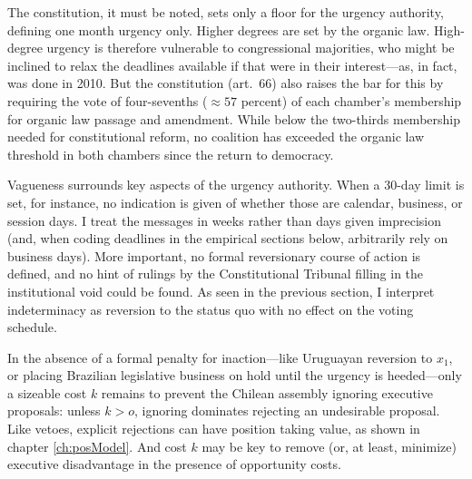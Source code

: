 \documentclass[letter,12pt]{article}
\begin{document}
The constitution, it must be noted, sets only a floor for the urgency authority, defining one month urgency only. Higher degrees are set by the organic law. High-degree urgency is therefore vulnerable to congressional majorities, who might be inclined to relax the deadlines available if that were in their interest---as, in fact, was done in 2010. But the constitution (art.~66) also raises the bar for this by requiring the vote of four-sevenths ($\approx 57$ percent) of each chamber's membership for organic law passage and amendment. While below the two-thirds membership needed for constitutional reform, no coalition has exceeded the organic law threshold in both chambers since the return to democracy.

Vagueness surrounds key aspects of the urgency authority. When a 30-day limit is set, for instance, no indication is given of whether those are calendar, business, or session days. I treat the messages in weeks rather than days given imprecision (and, when coding deadlines in the empirical sections below, arbitrarily rely on business days). More important, no formal reversionary course of action is defined, and no hint of rulings by the Constitutional Tribunal filling in the institutional void could be found. As seen in the previous section, I interpret indeterminacy as reversion to the status quo with no effect on the voting schedule.

In the absence of a formal penalty for inaction---like Uruguayan reversion to $x_1$, or placing Brazilian legislative business on hold until the urgency is heeded---only a sizeable cost $k$ remains to prevent the Chilean assembly ignoring executive proposals: unless $k>o$, ignoring dominates rejecting an undesirable proposal. Like vetoes, explicit rejections can have position taking value, as shown in chapter \ref{ch:posModel}. And cost $k$ may be key to remove (or, at least, minimize) executive disadvantage in the presence of opportunity costs. 
\end{document}

